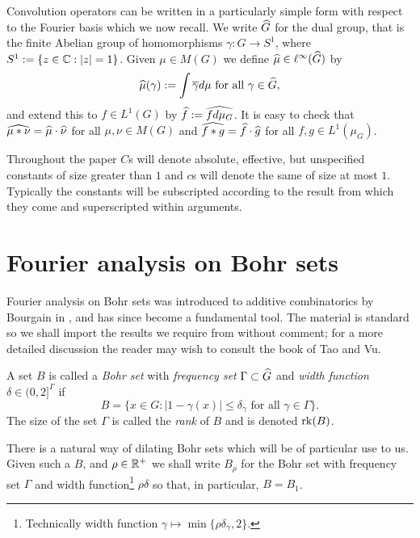 \documentclass[12pt]{amsart}  %
\begin{document}
Convolution operators can be written in a particularly simple form with respect to the Fourier basis which we now recall.  We write $\widehat{G}$ for the dual group, that is the finite Abelian group of homomorphisms $\gamma:G \rightarrow S^1$, where $S^1:=\{z \in \mathbb{C}:|z|=1\}$.  Given $\mu \in M(G)$ we define $\widehat{\mu} \in \ell^\infty(\widehat{G})$ by
\begin{equation*}
\widehat{\mu}(\gamma):=\int{\overline{\gamma}d\mu} \textrm{ for all } \gamma \in \widehat{G},
\end{equation*}
and extend this to $f \in L^1(G)$ by $\widehat{f}:=\widehat{fd\mu_G}$. It is easy to check that $\widehat{\mu \ast \nu} = \widehat{\mu}\cdot \widehat{\nu}$ for all $\mu,\nu \in M(G)$ and $\widehat{f \ast g} = \widehat{f} \cdot \widehat{g}$ for all $f,g \in L^1(\mu_G)$.

Throughout the paper $C$s will denote absolute, effective, but unspecified constants of size greater than $1$ and $c$s will denote the same of size at most $1$.  Typically the constants will be subscripted according to the result from which they come and superscripted within arguments.

\section{Fourier analysis on Bohr sets}

Fourier analysis on Bohr sets was introduced to additive combinatorics by Bourgain in \cite{bou::5}, and has since become a fundamental tool.  The material is standard so we shall import the results we require from \cite{san::01} without comment; for a more detailed discussion the reader may wish to consult the book \cite{taovu::} of Tao and Vu.

A set $B$ is called a \emph{Bohr set} with \emph{frequency set} $\Gamma \subset \widehat{G}$ and \emph{width function} $\delta \in (0,2]^\Gamma$ if
\begin{equation*}
B=\{x \in G: |1-\gamma(x)| \leq \delta_\gamma \textrm{ for
all }\gamma \in \Gamma\}.
\end{equation*}
The size of the set $\Gamma$ is called the \emph{rank} of $B$ and is denoted $\mathop{\rm rk}\nolimits(B)$.

There is a natural way of dilating Bohr sets which will be of particular use to us.  Given such a $B$, and $\rho \in \mathbb{R}^+$ we shall write $B_\rho$ for the Bohr set with frequency set $\Gamma$ and width function\footnote{Technically width function $\gamma \mapsto \min\{\rho \delta_\gamma,2\}$.} $\rho\delta$ so that, in particular, $B=B_1$.   
\end{document}
